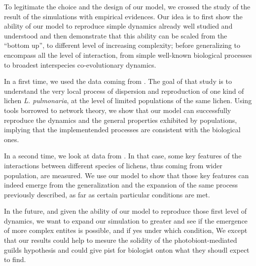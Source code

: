 \documentclass[runningheads,a4paper]{llncs}
\begin{document}
To legitimate the choice and the design of our model, we crossed the study of the result of the simulations with empirical evidences. Our idea is to first show the ability of our model to reproduce simple dynamics already well studied and understood and then demonstrate that this ability can be scaled from the ``bottom up'', to different level of increasing complexity; before generalizing to encompass all the level of interaction, from simple well-known biological processes to broadest interspecies co-evolutionary dynamics.

In a first time, we used the data coming from \cite{dal2012vertical}. The goal of that study is to understand the very local process of dispersion and reproduction of one kind of lichen {\em L. pulmonaria}, at the level of limited populations of the same lichen. Using tools borrowed to network theory, we show that our model can successfully reproduce the dynamics and the general properties exhibited by populations, implying that the implementended processes are consistent with the biological ones.

In a second time, we look at data from \cite{dal2014molecular}. In that case, some key features of the interactions between different species of lichens, thus coming from wider population, are measured. We use our model to show that those key features can indeed emerge from the generalization and the expansion of the same process previously described, as far as certain particular conditions are met. 

In the future, and given the ability of our model to reproduce those first level of dynamics, we want to expand our simulation to greater  and see if the emergence  of more complex entites is possible, and if yes under which condition, We except that our results could help to mesure the solidity of the photobiont-mediated guilds hypothesis and could give pist for biologist onton what they shoudl expect to find. 


\end{document}
